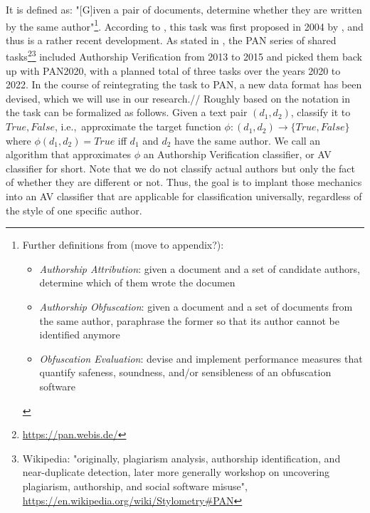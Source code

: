 It is defined as: "[G]iven a pair of documents, determine whether they are written by the same author"\footnote{
Further definitions from \cite{bevendorff2020shared} (move to appendix?):
\begin{itemize}
  \item \textit{Authorship Attribution}: given a document and a set of candidate authors, determine which of them wrote  the  documen
  \item \textit{Authorship Obfuscation}: given a document and a set of documents from the same author, paraphrase the former so that its author cannot be identified anymore
  \item \textit{Obfuscation Evaluation}: devise and implement performance measures that quantify safeness, soundness, and/or sensibleness of an obfuscation software
\end{itemize}
}.
According to \cite{stein2019unbiasedGutenbergCorpus}, this task was first proposed in 2004 by \cite{koppel2004unmasking}, and thus is a rather recent development.
As stated in \cite{bevendorff2020shared}, the PAN series of shared tasks\footnote{\url{https://pan.webis.de/}}\footnote{Wikipedia: "originally, plagiarism analysis, authorship identification, and near-duplicate detection, later more generally workshop on uncovering plagiarism, authorship, and social software misuse", \url{https://en.wikipedia.org/wiki/Stylometry\#PAN}} included Authorship Verification from 2013 to 2015 and picked them back up with PAN2020, with a planned total of three tasks over the years 2020 to 2022.
In the course of reintegrating the task to PAN, a new data format has been devised, which we will use in our research.//
Roughly based on the notation in \cite{bevendorff2020shared} the task can be formalized as follows.
Given a text pair $(d_1, d_2)$, classify it to ${True, False}$, i.e.,\ approximate the target function $\phi{}:(d_1, d_2)\to\{True, False\}$ where $\phi(d_1, d_2)=True$ iff $d_1$ and $d_2$ have the same author.
We call an algorithm that approximates $\phi$ an Authorship Verification classifier, or AV classifier for short.
Note that we do not classify actual authors but only the fact of whether they are different or not.
Thus, the goal is to implant those mechanics into an AV classifier that are applicable for classification universally, regardless of the style of one specific author.

